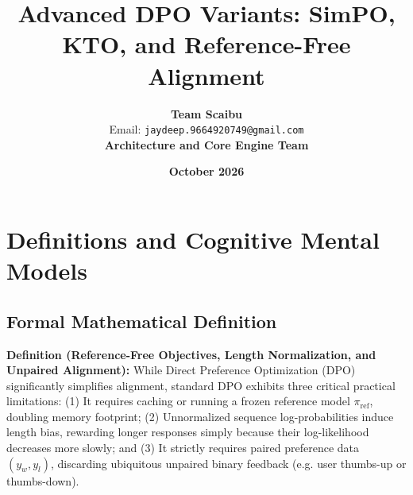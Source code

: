 \documentclass[11pt,a4paper]{article}
\title{\textbf{Advanced DPO Variants: SimPO, KTO, and Reference-Free Alignment}}
\author{\textbf{Team Scaibu} \\ \small Email: \texttt{jaydeep.9664920749@gmail.com} \\ \small \textbf{Architecture and Core Engine Team}}
\date{\textbf{October 2026}}
\theoremstyle{definition}
\begin{document}
\maketitle

\section{Definitions and Cognitive Mental Models}

\subsection{Formal Mathematical Definition}
\textbf{Definition (Reference-Free Objectives, Length Normalization, and Unpaired Alignment):}
While Direct Preference Optimization (DPO) significantly simplifies alignment, standard DPO exhibits three critical practical limitations: (1) It requires caching or running a frozen reference model $\pi_{\text{ref}}$, doubling memory footprint; (2) Unnormalized sequence log-probabilities induce length bias, rewarding longer responses simply because their log-likelihood decreases more slowly; and (3) It strictly requires paired preference data $(y_w, y_l)$, discarding ubiquitous unpaired binary feedback (e.g. user thumbs-up or thumbs-down).
\end{document}
